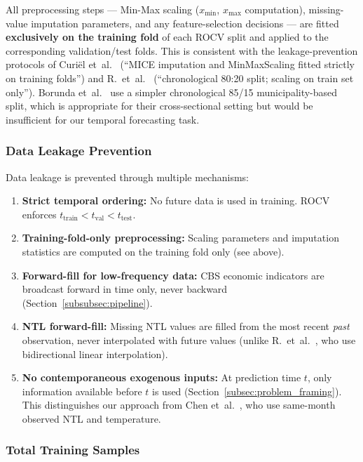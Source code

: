 All preprocessing steps --- Min-Max scaling ($x_{\min}$, $x_{\max}$ computation), missing-value imputation parameters, and any feature-selection decisions --- are fitted \textbf{exclusively on the training fold} of each ROCV split and applied to the corresponding validation/test folds. This is consistent with the leakage-prevention protocols of Curi\"el et~al.~\cite{curiel_integrating_2025} (``MICE imputation and MinMaxScaling fitted strictly on training folds'') and R.~et~al.~\cite{r_forecasting_2025} (``chronological 80:20 split; scaling on train set only''). Borunda et~al.~\cite{borunda_machine_2025} use a simpler chronological 85/15 municipality-based split, which is appropriate for their cross-sectional setting but would be insufficient for our temporal forecasting task.

\subsubsection{Data Leakage Prevention}
\label{subsubsec:leakage}

Data leakage is prevented through multiple mechanisms:

\begin{enumerate}
    \item \textbf{Strict temporal ordering:} No future data is used in training. ROCV enforces $t_{\text{train}} < t_{\text{val}} < t_{\text{test}}$.
    \item \textbf{Training-fold-only preprocessing:} Scaling parameters and imputation statistics are computed on the training fold only (see above).
    \item \textbf{Forward-fill for low-frequency data:} CBS economic indicators are broadcast forward in time only, never backward (Section~\ref{subsubsec:pipeline}).
    \item \textbf{NTL forward-fill:} Missing NTL values are filled from the most recent \emph{past} observation, never interpolated with future values (unlike R.~et~al.~\cite{r_forecasting_2025}, who use bidirectional linear interpolation).
    \item \textbf{No contemporaneous exogenous inputs:} At prediction time $t$, only information available before $t$ is used (Section~\ref{subsec:problem_framing}). This distinguishes our approach from Chen et~al.~\cite{chen_monthly_2025}, who use same-month observed NTL and temperature.
\end{enumerate}

\subsubsection{Total Training Samples}
\label{subsubsec:training_samples}

